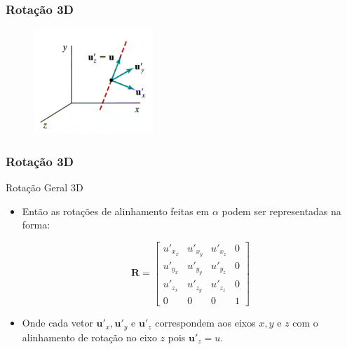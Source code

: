 \documentclass{beamer}
\begin{document}
\begin{frame}
\frametitle{Rotação 3D}

		\begin{figure}[!h]
			\begin{center}
      				\includegraphics[width=0.4\textwidth]{Figures/vec}
			\end{center}
		\end{figure}

\end{frame}


\begin{frame}
\frametitle{Rotação 3D}


	\begin{block}{Rotação Geral 3D}
		\begin{itemize}
			\item Então as rotações de alinhamento feitas em $\alpha$ podem ser representadas na forma:
			
			\begin{equation*}
				\textbf{R} = \begin{bmatrix}
					u'_{x_x}	& u'_{x_y}		& u'_{x_z} & 0 \\
					u'_{y_x}	& u'_{y_y}		& u'_{y_z} & 0 \\
					u'_{z_x}	& u'_{z_y}		& u'_{z_z} & 0 \\
					0			& 0				& 0	& 1
				\end{bmatrix}
			\end{equation*}
			
			\item Onde cada vetor $\textbf{u}'_x,\textbf{u}'_y$ e $\textbf{u}'_z$ correspondem aos eixos $x,y$ e $z$ com o alinhamento de rotação no eixo $z$ pois $\textbf{u}'_z = u$.
		\end{itemize}
	\end{block}

\end{frame}
\end{document}
